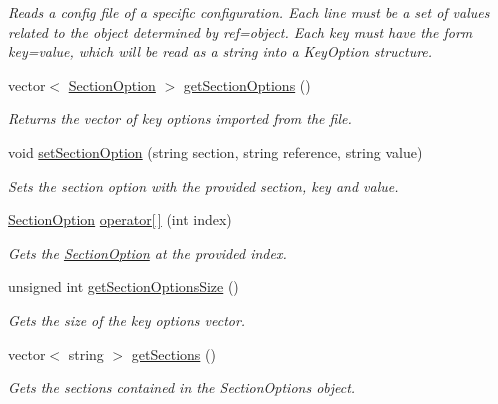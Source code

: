 \begin{DoxyCompactItemize}
\begin{DoxyCompactList}\small\item\em Reads a config file of a specific configuration. Each line must be a set of values related to the object determined by ref=\textquotesingle{}object\textquotesingle{}. Each key must have the form key=value, which will be read as a string into a Key\+Option structure. \end{DoxyCompactList}\item 
vector$<$ \hyperlink{struct_section_option}{Section\+Option} $>$ \hyperlink{class_config_option_a7d9570023d8c96962f90784283b68859}{get\+Section\+Options} ()
\begin{DoxyCompactList}\small\item\em Returns the vector of key options imported from the file. \end{DoxyCompactList}\item 
void \hyperlink{class_config_option_ac824f16f50a77fcc5c11d5ac3fb244cc}{set\+Section\+Option} (string section, string reference, string value)
\begin{DoxyCompactList}\small\item\em Sets the section option with the provided section, key and value. \end{DoxyCompactList}\item 
\hyperlink{struct_section_option}{Section\+Option} \hyperlink{class_config_option_a66d2199cf3bd4fa015ef38e34fe02bd1}{operator\mbox{[}$\,$\mbox{]}} (int index)
\begin{DoxyCompactList}\small\item\em Gets the \hyperlink{struct_section_option}{Section\+Option} at the provided index. \end{DoxyCompactList}\item 
unsigned int \hyperlink{class_config_option_acb7b9141efc8d0e50e21ff1adce8e9cb}{get\+Section\+Options\+Size} ()
\begin{DoxyCompactList}\small\item\em Gets the size of the key options vector. \end{DoxyCompactList}\item 
vector$<$ string $>$ \hyperlink{class_config_option_a025402f31cd098e827dee09d08736398}{get\+Sections} ()
\begin{DoxyCompactList}\small\item\em Gets the sections contained in the Section\+Options object. \end{DoxyCompactList}\item 

\end{DoxyCompactItemize}
